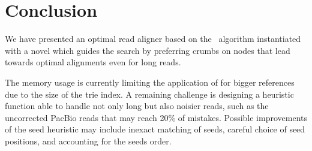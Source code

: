 \section{Conclusion}
%
We have presented an optimal read aligner based on the \A~algorithm instantiated
with a novel \seedh which guides the search by preferring crumbs on nodes that lead
towards optimal alignments even for long reads.

The memory usage is currently limiting the application of \astarix for bigger
references due to the size of the trie index. A remaining challenge is designing
a heuristic function able to handle not only long but also noisier reads, such
as the uncorrected PacBio reads that may reach 20\% of mistakes. Possible
improvements of the seed heuristic may include inexact matching of seeds,
careful choice of seed positions, and accounting for the seeds order.
